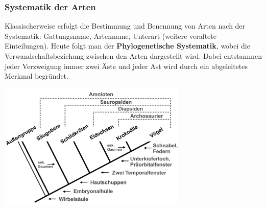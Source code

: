 \subsubsection{Systematik der Arten}

Klassischerweise erfolgt die Bestimmung und Benennung von Arten nach der Systematik: Gattungsname, Artenname, Unterart (weitere veraltete Einteilungen). Heute folgt man der \textbf{Phylogenetische Systematik}, wobei die Verwandschaftsbeziehung zwischen den Arten dargestellt wird. Dabei entstammen jeder Verzweigung immer zwei Äste und jeder Ast wird durch ein abgeleitetes Merkmal begründet.

\begin{center}
		\includegraphics[width=9cm]{lec1/figures/phylogenetische_systematik.png}
\end{center}
